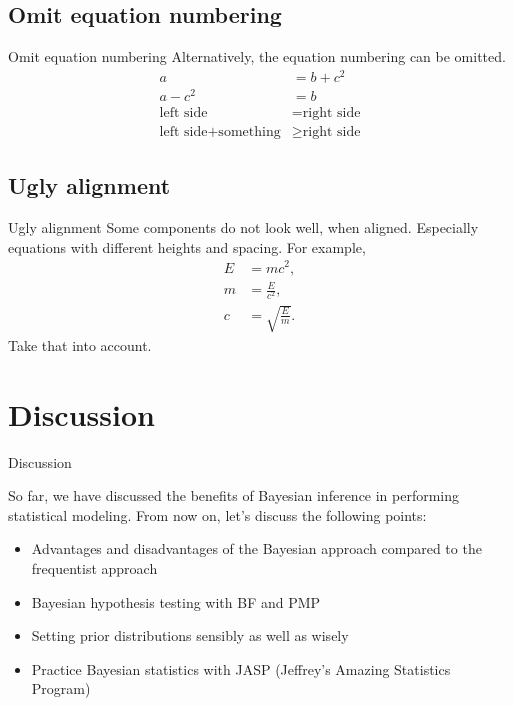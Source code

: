 \documentclass[aspectratio=169]{beamer}
\begin{document}
\subsection{Omit equation numbering}

\begin{frame}{Omit equation numbering}
Alternatively, the equation numbering can be omitted.
\begin{align*}
a&=b+c^2\\
a-c^2&=b\\
\text{left side} &= \text{right side}\\
\text{left side} + \text{something} &\geq \text{right side}
\end{align*}
\end{frame}

\subsection{Ugly alignment}

\begin{frame}{Ugly alignment}
Some components do not look well, when aligned. Especially equations with different heights and spacing. For example,
\begin{align}
E &= mc^2,\\
m &= \frac{E}{c^2},\\
c &= \sqrt{ \frac{E}{m} }.
\end{align}
Take that into account.
\end{frame}

\section{Discussion}

\begin{frame}{Discussion}

So far, we have discussed the benefits of Bayesian inference in performing statistical modeling. From now on, let's discuss the following points:

\begin{itemize}

\item Advantages and disadvantages of the Bayesian approach compared to the frequentist approach
\item Bayesian hypothesis testing with BF and PMP
\item Setting prior distributions sensibly as well as wisely
\item Practice Bayesian statistics with JASP (Jeffrey's Amazing Statistics Program)

\end{itemize}

\end{frame}
\end{document}
